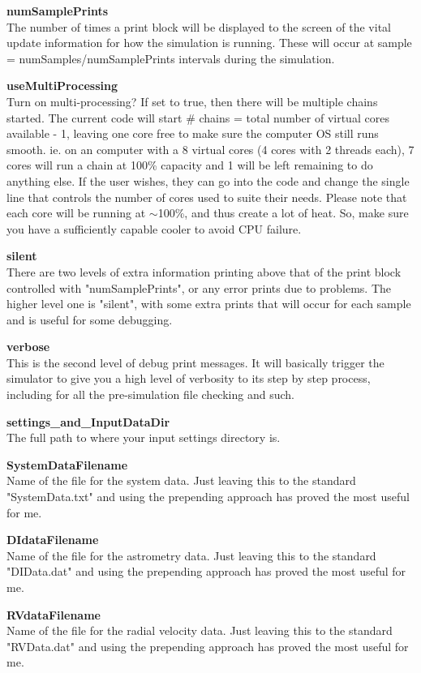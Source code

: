 \documentclass[12pt,preprint]{aastex}
\begin{document}
{\bf numSamplePrints}\\
The number of times a print block will be displayed to the screen of the vital update information for how the simulation is running.  These will occur at sample = numSamples/numSamplePrints intervals during the simulation.

{\bf useMultiProcessing}\\
Turn on multi-processing?  If set to true, then there will be multiple chains started.  The current code will start \# chains = total number of virtual cores available - 1, leaving one core free to make sure the computer OS still runs smooth. ie. on an computer with a 8 virtual cores (4 cores with 2 threads each), 7 cores will run a chain at 100\% capacity and 1 will be left remaining to do anything else.  If the user wishes, they can go into the code and change the single line that controls the number of cores used to suite their needs.  Please note that each core will be running at $\sim$100\%, and thus create a lot of heat.  So, make sure you have a sufficiently capable cooler to avoid CPU failure.

{\bf silent}\\
There are two levels of extra information printing above that of the print block controlled with "numSamplePrints", or any error prints due to problems.  The higher level one is "silent", with some extra prints that will occur for each sample and is useful for some debugging.


{\bf verbose}\\
This is the second level of debug print messages.  It will basically trigger the simulator to give you a high level of verbosity to its step by step process, including for all the pre-simulation file checking and such.

{\bf settings\_and\_InputDataDir}\\
The full path to where your input settings directory is.  

{\bf SystemDataFilename}\\
Name of the file for the system data.  Just leaving this to the standard "SystemData.txt" and using the prepending approach has proved the most useful for me.

{\bf DIdataFilename}\\
Name of the file for the astrometry data.  Just leaving this to the standard "DIData.dat" and using the prepending approach has proved the most useful for me.

{\bf RVdataFilename}\\
Name of the file for the radial velocity data.  Just leaving this to the standard "RVData.dat" and using the prepending approach has proved the most useful for me.
\end{document}
